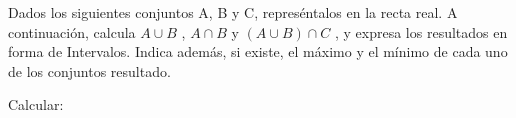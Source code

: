 \documentclass[addpoints,spanish, 12pt,a4paper]{exam}
\begin{document}
        \begin{questions}
        \question Dados los siguientes conjuntos A, B y C, represéntalos en la recta real. A continuación, calcula $A \cup  B$ , $A \cap B$ y $(A \cup B) \cap C$ , 
y expresa los resultados en forma de Intervalos. 
Indica además, si existe, el máximo y el mínimo de cada uno de los conjuntos resultado.
        \begin{multicols}{1} 
        \begin{parts} \part[1]  $ A=\left\{ x \in \mathbb{R}| 6 \leq x \wedge x < 8 \right\}, \\ B=\left(-\infty, -3\right) \cup \left(3, \infty\right)  y \\  C=\left\{ x \in \mathbb{R}| \left|{x - 3}\right|\leq12 \right\} \\ $  \begin{solution}  $ C=\left[-9, 15\right] \ \ A \cup  B = \left(-\infty, -3\right) \cup \left(3, \infty\right)  \\  A \cap B= \left[6, 8\right)   \\  (A \cup B) \cap C= \left[-9, -3\right) \cup \left(3, 15\right] $  \end{solution}
        \end{parts}
        \end{multicols}
        \question Calcular:
        \begin{multicols}{1} 
        \end{multicols}

\end{questions}
\end{document}
